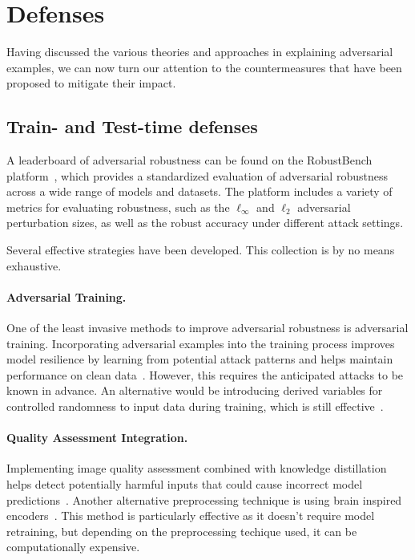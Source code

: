 \documentclass[a4paper, oneside]{discothesis}
\begin{document}
\section{Defenses}

Having discussed the various theories and approaches in explaining adversarial examples, we can now turn our attention to the countermeasures that have been proposed to mitigate their impact.

\subsection{Train- and Test-time defenses}

A leaderboard of adversarial robustness can be found on the RobustBench platform~\cite{croce2021robustbench}, which provides a standardized evaluation of adversarial robustness across a wide range of models and datasets. The platform includes a variety of metrics for evaluating robustness, such as the $\ell_\infty$ and $\ell_2$ adversarial perturbation sizes, as well as the robust accuracy under different attack settings.

Several effective strategies have been developed. This collection is by no means exhaustive.

\paragraph{Adversarial Training.} One of the least invasive methods to improve adversarial robustness is adversarial training. Incorporating adversarial examples into the training process improves model resilience by learning from potential attack patterns and helps maintain performance on clean data~\cite{araujo2020advocating, Ren2022VulnerabilityAR}. However, this requires the anticipated attacks to be known in advance. An alternative would be introducing derived variables for controlled randomness to input data during training, which is still effective~\cite{Adeke2023SecuringNT}.

\paragraph{Quality Assessment Integration.} Implementing image quality assessment combined with knowledge distillation helps detect potentially harmful inputs that could cause incorrect model predictions~\cite{feng2020towards}. Another alternative preprocessing technique is using brain inspired encoders~\cite{Rakhimberdina2022StrengtheningRU}. This method is particularly effective as it doesn't require model retraining, but depending on the preprocessing techique used, it can be computationally expensive.
\end{document}
